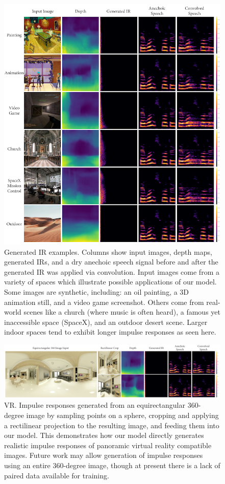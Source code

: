 \documentclass[10pt,twocolumn,letterpaper]{article}
\begin{document}
\begin{figure}
    \centering
    \includegraphics[width=\columnwidth]{p_all.png}
    \caption{Generated IR examples. Columns show input images, depth maps, generated IRs, and a dry anechoic speech signal before and after the generated IR was applied via convolution. Input images come from a variety of spaces which illustrate possible applications of our model. Some images are synthetic, including: an oil painting, a 3D animation still, and a video game screenshot. Others come from real-world scenes like a church (where music is often heard), a famous yet inaccessible space (SpaceX), and an outdoor desert scene. Larger indoor spaces  tend to exhibit longer impulse responses as seen here.}
    \label{fig:p_all}
\end{figure}

\begin{figure}
    \centering
    \includegraphics[width=\columnwidth]{p_vr.png}
    \caption{VR. Impulse responses generated from an equirectangular 360-degree image by sampling points on a sphere, cropping and applying a rectilinear projection to the resulting image, and feeding them into our model. This demonstrates how our model directly generates realistic impulse responses of panoramic virtual reality compatible images. Future work may allow generation of impulse responses using an entire 360-degree image, though at present there is a lack of paired data available for training.}
    \label{fig:p_vr}
\end{figure}
\end{document}
